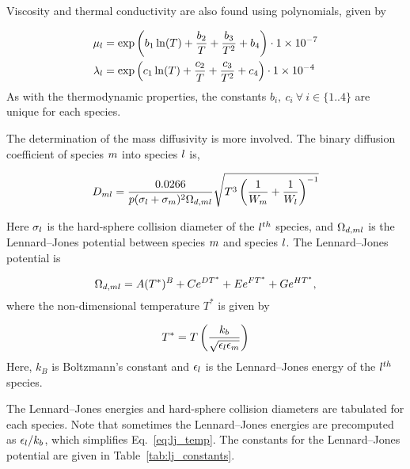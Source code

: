Viscosity and thermal conductivity are also found using polynomials, given by

\begin{align}
	\mu_{l} &= \exp \left(b_1 \ln(T) + \frac{b_2}{T} + \frac{b_3}{T^2} + b_4 \right) \cdot 1 \times 10^{-7} \\
	\lambda_{l} &= \exp \left(c_1 \ln(T) + \frac{c_2}{T} + \frac{c_3}{T^2} + c_4 \right) \cdot 1 \times 10^{-4}
\end{align}
As with the thermodynamic properties, the constants $b_i, \ c_i  \ \forall \ i \in \{1..4\}$ are unique for each species.

The determination of the mass diffusivity is more involved. The binary diffusion coefficient of species $m$ into species $l$ is,

\begin{equation}
	D_{m l} = \frac{0.0266}{p(\sigma_{l} + \sigma_{m})^2 \Omega_{d,m l}} \sqrt{T^3 \left( \frac{1}{W_{m}} + \frac{1}{W_{l}} \right)^{-1}}
\end{equation}

Here $\sigma_{l}$ is the hard-sphere collision diameter of the $l^{th}$ species, and $\Omega_{d,m l}$ is the Lennard--Jones potential between species $m$ and species $l$. The Lennard--Jones potential is 

\begin{equation}
	\Omega_{d,m l} = A (T^*)^{B} + C e^{DT^*} + E e^{FT^*} + G e^{HT^*},
\end{equation}
where the non-dimensional temperature $T^*$ is given by

\begin{equation}\label{eq:lj_temp}
	T^* = T \left( \frac{k_b}{\sqrt{\epsilon_{l} \epsilon_{m}}} \right)
\end{equation}
Here, $k_B$ is Boltzmann's constant and $\epsilon_{l}$ is the Lennard--Jones energy of the $l^{th}$ species.

The Lennard--Jones energies and hard-sphere collision diameters are tabulated for each species. Note that sometimes the Lennard--Jones energies are precomputed as $\epsilon_{l} / k_b$, which simplifies Eq.~\ref{eq:lj_temp}. The constants for the Lennard--Jones potential are given in Table~\ref{tab:lj_constants}.

